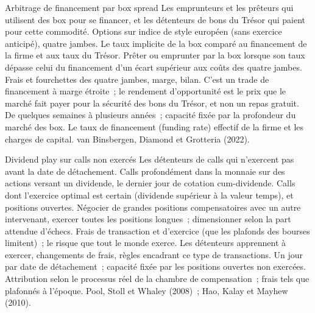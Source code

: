\begin{strategyfile}{Arbitrage de financement par box spread}\label{strat:hf:options-cross-venue-and-volatility-arbitrage-at-speed:box}
 Les emprunteurs et les prêteurs qui utilisent des box pour se financer, et les détenteurs de bons du Trésor qui paient pour cette commodité.
 Options sur indice de style européen (sans exercice anticipé), quatre jambes.
 Le taux implicite de la box comparé au financement de la firme et aux taux du Trésor.
 Prêter ou emprunter par la box lorsque son taux dépasse celui du financement d'un écart supérieur aux coûts des quatre jambes.
 Frais et fourchettes des quatre jambes, marge, bilan.
 C'est un trade de financement à marge étroite~; le rendement d'opportunité est le prix que le marché fait payer pour la sécurité des bons du Trésor, et non un
repas gratuit.
 De quelques semaines à plusieurs années~; capacité fixée par la profondeur du marché des box.
 Le taux de financement (funding rate) effectif de la firme et les charges de capital.
 van Binsbergen, Diamond et Grotteria (2022).
\end{strategyfile}

\begin{strategyfile}{Dividend play sur calls non exercés}\label{strat:hf:options-cross-venue-and-volatility-arbitrage-at-speed:dividend}
 Les détenteurs de calls qui n'exercent pas avant la date de détachement.
 Calls profondément dans la monnaie sur des actions versant un dividende, le dernier jour de cotation cum-dividende.
 Calls dont l'exercice optimal est certain (dividende supérieur à la valeur temps), et positions ouvertes.
 Négocier de grandes positions compensatoires avec un autre intervenant, exercer toutes les positions longues~; dimensionner selon la part attendue d'échecs.
 Frais de transaction et d'exercice (que les plafonds des bourses limitent)~; le risque que tout le monde exerce.
 Les détenteurs apprennent à exercer, changements de frais, règles encadrant ce type de transactions.
 Un jour par date de détachement~; capacité fixée par les positions ouvertes non exercées.
 Attribution selon le processus réel de la chambre de compensation~; frais tels que plafonnés à l'époque.
 Pool, Stoll et Whaley (2008)~; Hao, Kalay et Mayhew (2010).
\end{strategyfile}

